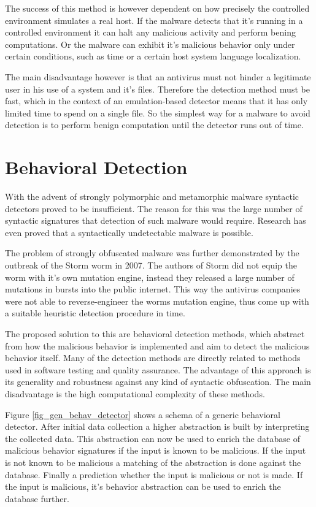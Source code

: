 The success of this method is however dependent on how precisely the controlled environment simulates a real host. If the malware detects that it's running in a controlled environment it can halt any malicious activity and perform bening computations. Or the malware can exhibit it's malicious behavior only under certain conditions, such as time or a certain host system language localization.

The main disadvantage however is that an antivirus must not hinder a legitimate user in his use of a system and it's files. Therefore the detection method must be fast, which in the context of an emulation-based detector means that it has only limited time to spend on a single file. So the simplest way for a malware to avoid detection is to perform benign computation until the detector runs out of time.

\section{Behavioral Detection}
With the advent of strongly polymorphic and metamorphic malware syntactic detectors proved to be insufficient. The reason for this was the large number of syntactic signatures that detection of such malware would require. Research has even proved that a syntactically undetectable malware is possible\cite{Filiol07}. 

The problem of strongly obfuscated malware was further demonstrated by the outbreak of the Storm worm in 2007. The authors of Storm did not equip the worm with it's own mutation engine, instead they released a large number of mutations in bursts into the public internet. This way the antivirus companies were not able to reverse-engineer the worms mutation engine, thus come up with a suitable heuristic detection procedure in time.

The proposed solution to this are behavioral detection methods, which abstract from how the malicious behavior is implemented and aim to detect the malicious behavior itself. Many of the detection methods are directly related to methods used in software testing and quality assurance. The advantage of this approach is its generality and robustness against any kind of syntactic obfuscation. The main disadvantage is the high computational complexity of these methods. 

Figure \ref{fig_gen_behav_detector} shows a schema of a generic behavioral detector. After initial data collection a higher abstraction is built by interpreting the collected data. This abstraction can now be used to enrich the database of malicious behavior signatures if the input is known to be malicious. If the input is not known to be malicious a matching of the abstraction is done against the database. Finally a prediction whether the input is malicious or not is made. If the input is malicious, it's behavior abstraction can be used to enrich the database further.

